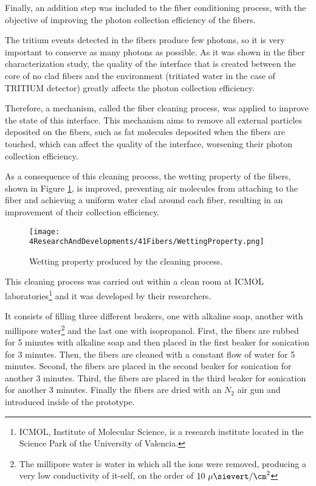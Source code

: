 Finally, an addition step was included to the fiber conditioning process, with the objective of improving the photon collection efficiency of the fibers. 

The tritium events detected in the fibers produce few photons, so it is very important to conserve as many photons as possible. As it was shown in the fiber characterization study, the quality of the interface that is created between the core of no clad fibers and the environment (tritiated water in the case of TRITIUM detector) greatly affects the photon collection efficiency.

Therefore, a mechanism, called the fiber cleaning process, was applied to improve the state of this interface. This mechanism aims to remove all external particles deposited on the fibers, such as fat molecules deposited when the fibers are touched, which can affect the quality of the interface, worsening their photon collection efficiency. 

As a consequence of this cleaning process, the wetting property of the fibers, shown in Figure \ref{fig:WettingProperty}, is improved, preventing air molecules from attaching to the fiber and achieving a uniform water clad around each fiber, resulting in an improvement of their collection efficiency. 


\begin{figure}[h]
\centering
\texttt{[image: 4ResearchAndDevelopments/41Fibers/WettingProperty.png]}
\caption{Wetting property produced by the cleaning process. \cite{}\label{fig:WettingProperty}}
\end{figure}


This cleaning process  was carried out within a clean room at ICMOL laboratories\footnote{ICMOL, Institute of Molecular Science, is a research institute located in the Science Park of the University of Valencia.} and it was developed by their researchers.

It consists of filling three different beakers, one with alkaline soap, another with millipore water\footnote{The millipore water is water in which all the ions were removed, producing a very low conductivity of it-self, on the order of $10~\mu\sievert/\cm^2$} and the last one with isopropanol. First, the fibers are rubbed for 5 minutes with alkaline soap and then placed in the first beaker for sonication for 3 minutes. Then, the fibers are cleaned with a constant flow of water for 5 minutes. Second, the fibers are placed in the second beaker for sonication for another 3 minutes. Third, the fibers are placed in the third beaker for sonication for another 3 minutes. Finally the fibers are dried with an $N_2$ air gun and introduced inside of the prototype.

